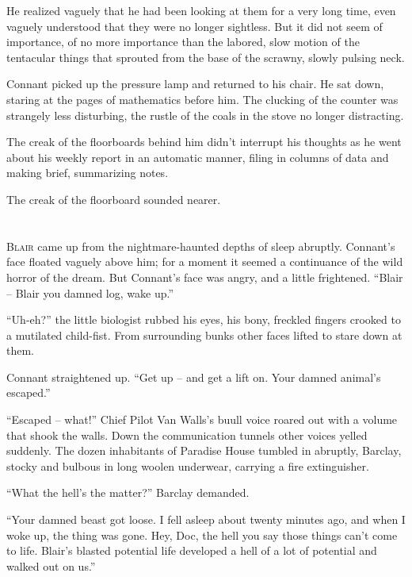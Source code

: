\documentclass[letterpaper,openany,12pt]{memoir}		%
\begin{document}
He realized vaguely that he had been looking at them for a very long time, even
vaguely understood that they were no longer sightless. But it did not seem of
importance, of no more importance than the labored, slow motion of the
tentacular things that sprouted from the base of the scrawny, slowly pulsing
neck.

Connant picked up the pressure lamp and returned to his chair. He sat down,
staring at the pages of mathematics before him. The clucking of the counter was
strangely less disturbing, the rustle of the coals in the stove no longer
distracting.

The creak of the floorboards behind him didn't interrupt his thoughts as he went
about his weekly report in an automatic manner, filing in columns of data and
making brief, summarizing notes.

The creak of the floorboard sounded nearer.


\chapter[Chapter 5]{}

\lettrine[lines=3,findent=2pt,nindent=2pt]{B}{lair} came up from the
nightmare-haunted depths of sleep abruptly. Connant's face floated vaguely above
him; for a moment it seemed a continuance of the wild horror of the dream. But
Connant's face was angry, and a little frightened. ``Blair -- Blair you damned
log, wake up.''

``Uh-eh?'' the little biologist rubbed his eyes, his bony, freckled fingers
crooked to a mutilated child-fist. From surrounding bunks other faces lifted to
stare down at them.

Connant straightened up. ``Get up -- and get a lift on. Your damned animal's
escaped.''

``Escaped -- what!'' Chief Pilot Van Walls's buull voice roared out with a
volume that shook the walls. Down the communication tunnels other voices yelled
suddenly. The dozen inhabitants of Paradise House tumbled in abruptly, Barclay,
stocky and bulbous in long woolen underwear, carrying a fire extinguisher.

``What the hell's the matter?'' Barclay demanded.

``Your damned beast got loose. I fell asleep about twenty minutes ago, and when
I woke up, the thing was gone. Hey, Doc, the hell you say those things can't
come to life. Blair's blasted potential life developed a hell of a lot of
potential and walked out on us.''
\end{document}
